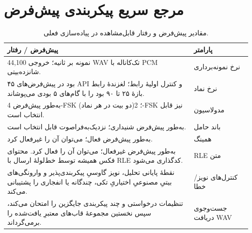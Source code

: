 \documentclass[12pt,a4paper]{article}
\providecommand{\lr}[1]{\foreignlanguage{english}{\begingroup\hyphenchar\font=-1 #1\endgroup}}
\begin{document}
\appendix
\renewcommand{\thesection}{الف}
\section{مرجع سریع پیکربندی پیش‌فرض}
\label{app:defaults}
\begin{table}[ht]
\centering
\begin{tabularx}{\textwidth}{@{}Xl@{}}
\toprule
\textbf{پیش‌فرض / رفتار} & \textbf{پارامتر} \\
\midrule
\lr{44,100} نمونه بر ثانیه؛ خروجی \lr{WAV} تک‌کاناله با \lr{PCM} شانزده‌بیتی. & نرخ نمونه‌برداری \\
۴۵ بود در پیش‌فرض‌های \lr{API} و کنترل اولیۀ رابط؛ لغزندۀ رابط بازۀ ۲۵ تا ۹۰ بود را با گام‌های ۵ بودی می‌پوشاند. & نرخ نماد \\
به‌طور پیش‌فرض \lr{4-FSK} (دو بیت در هر نماد)؛ \lr{2-FSK} نیز قابل انتخاب است. & مدولاسیون \\
به‌طور پیش‌فرض شنیداری؛ نزدیک‌به‌فراصوت قابل انتخاب است. & باند حامل \\
به‌طور پیش‌فرض فعال؛ می‌توان آن را غیرفعال کرد. & همینگ \\
به‌طور پیش‌فرض غیرفعال؛ می‌توان آن را فعال کرد. محتوای فکس همیشه توسط خط‌لولۀ ارسال با \lr{RLE} کدگذاری می‌شود. & \lr{RLE} متن \\
نقطۀ پایانی تحلیل، نویز گاوسیِ پیکربندی‌پذیر و وارونگی‌های بیتیِ مصنوعیِ اختیاریِ تکی، چندگانه یا انفجاری را پشتیبانی می‌کند. & کنترل‌های نویز/خطا \\
تنظیمات درخواستی و چند پیکربندی جایگزین را امتحان می‌کند، سپس نخستین مجموعۀ قاب‌های معتبرِ یافت‌شده را برمی‌گرداند. & جست‌وجوی دریافت \lr{WAV} \\
\bottomrule
\end{tabularx}
\caption{مقادیر پیش‌فرض و رفتار قابل‌مشاهده در پیاده‌سازی فعلی.}
\end{table}
\end{document}
